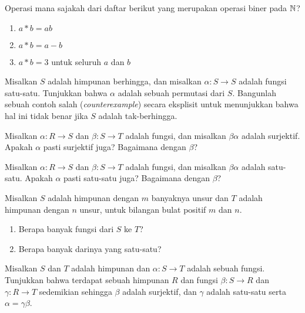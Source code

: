 \begin{exc}
Operasi mana sajakah dari daftar berikut yang merupakan operasi biner pada $\mathbb{N}$?
  \begin{enumerate}
    \item $a * b = ab$
    \item $a * b = a - b$
    \item $a * b = 3$ untuk seluruh $a$ dan $b$
  \end{enumerate}
\end{exc}

\begin{exc}
Misalkan $S$ adalah himpunan berhingga, dan misalkan $\alpha : S \rightarrow S$ adalah fungsi satu-satu. Tunjukkan bahwa $\alpha$ adalah sebuah permutasi dari $S$. Bangunlah sebuah contoh salah (\textit{counterexample}) secara eksplisit untuk menunjukkan bahwa hal ini tidak benar jika $S$ adalah tak-berhingga.
\end{exc}

\begin{exc}
Misalkan $\alpha : R \rightarrow S$ dan $\beta : S \rightarrow T$ adalah fungsi, dan misalkan $\beta \alpha$ adalah surjektif. Apakah $\alpha$ pasti surjektif juga? Bagaimana dengan $\beta$?
\end{exc}

\begin{exc}
Misalkan $\alpha : R \rightarrow S$ dan $\beta : S \rightarrow T$ adalah fungsi, dan misalkan $\beta \alpha$ adalah satu-satu. Apakah $\alpha$ pasti satu-satu juga? Bagaimana dengan $\beta$?
\end{exc}

\begin{exc}
Misalkan $S$ adalah himpunan dengan $m$ banyaknya unsur dan $T$ adalah himpunan dengan $n$ unsur, untuk bilangan bulat positif $m$ dan $n$.
  \begin{enumerate}
    \item Berapa banyak fungsi dari $S$ ke $T$?
    \item Berapa banyak darinya yang satu-satu?
  \end{enumerate}
\end{exc}

\begin{exc}
Misalkan $S$ dan $T$ adalah himpunan dan $\alpha : S \rightarrow T$ adalah sebuah fungsi. Tunjukkan bahwa terdapat sebuah himpunan $R$ dan fungsi $\beta : S \rightarrow R$ dan $\gamma : R \rightarrow T$ sedemikian sehingga $\beta$ adalah surjektif, dan $\gamma$ adalah satu-satu serta $\alpha = \gamma \beta$.
\end{exc}
